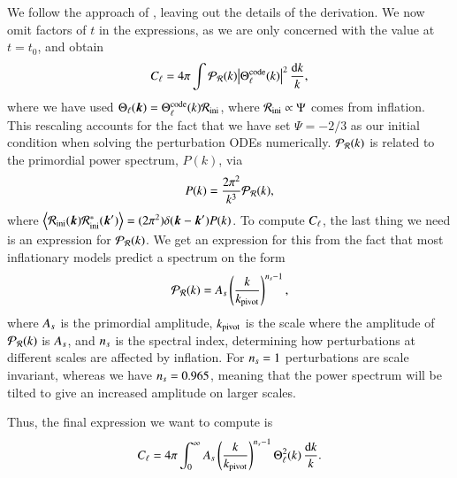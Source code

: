 We follow the approach of \cite[Ch. 9.5]{Dodelson}, leaving out the details of the derivation. We now omit factors of $t$ in the expressions, as we are only concerned with the value at $t=t_0$, and obtain   
\begin{equation} \label{eq:M4:theory:C_ell_integral_definition}
    C_\ell = 4\pi \int \mathcal{P}_{\mathcal{R}} (k) \abs{\Theta_\ell^\mathrm{code}(k)}^2 \,\frac{\dd k}{k},
\end{equation}
where we have used $\Theta_\ell(\boldsymbol{k})= \Theta_\ell^\mathrm{code}(k) \mathcal{R}_\mathrm{ini}$, where $\mathcal{R}_\mathrm{ini}\propto\Psi$ comes from inflation. This rescaling accounts for the fact that we have set $\Psi=-2/3$ as our initial condition when solving the perturbation ODEs numerically. $\mathcal{P}_{\mathcal{R}}(k)$ is related to the primordial power spectrum, $P(k)$, via 
\begin{equation} \label{eq:M4:theory:primordial_power_spectrum_}
    P(k) = \frac{2\pi^2}{k^3}\mathcal{P}_{\mathcal{R}}(k),
\end{equation}
where $\expval{\mathcal{R}_\mathrm{ini}(\ensuremath{\boldsymbol{k}}) \mathcal{R}_\mathrm{ini}^*(\ensuremath{\boldsymbol{k}}')}=(2\pi^2)\delta(\boldsymbol{k}-\boldsymbol{k}') P(k)$. To compute $C_\ell$, the last thing we need is an expression for $\mathcal{P}_{\mathcal{R}}(k)$. We get an expression for this from the fact that most inflationary models predict a spectrum on the form 
\begin{equation} \label{eq:M4:theory:primordial_power_spectrum}
    \mathcal{P}_{\mathcal{R}}(k) = A_s \left( \frac{k}{k_\mathrm{pivot}} \right)^{n_s-1}, 
\end{equation}
where $A_s$ is the primordial amplitude, $k_\mathrm{pivot}$ is the scale where the amplitude of $\mathcal{P}_{\mathcal{R}}(k)$ is $A_s$, and $n_s$ is the spectral index, determining how perturbations at different scales are affected by inflation. For $n_s=1$ perturbations are scale invariant, whereas we have $n_s=0.965$, meaning that the power spectrum will be tilted to give an increased amplitude on larger scales.   

Thus, the final expression we want to compute is 
\begin{equation} \label{eq:M4:theory:CMB_power_spectrum}
    C_\ell = 4\pi \int_0^\infty A_s \left( \frac{k}{k_\mathrm{pivot}} \right)^{n_s-1} \Theta_\ell^2(k) \, \frac{\dd k}{k}.
\end{equation}

